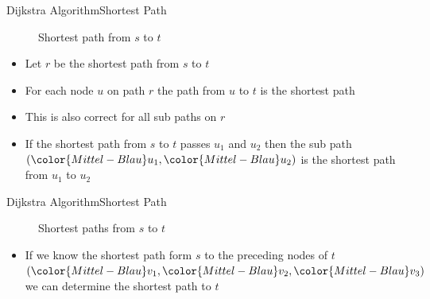 \begin{frame}{Dijkstra Algorithm}{Shortest Path}
  \vspace{-1.5em}
  \begin{figure}
    \begin{adjustbox}{width=0.75\linewidth}
      
    \end{adjustbox}
    \label{fig:dijkstra:shortest_path_introduction_re}
    \caption{Shortest path from {\color{Mittel-Blau}$s$} to
      {\color{Mittel-Blau}$t$}}
  \end{figure}
  \vspace{-1.5em}
  \begin{itemize}
    \item
      Let {\color{Mittel-Gruen}$r$} be the shortest path from
      {\color{Mittel-Blau}$s$} to {\color{Mittel-Blau}$t$}
    \item
      For each node {\color{Mittel-Blau}$u$} on path {\color{Mittel-Gruen}$r$}
      the path from {\color{Mittel-Blau}$u$} to {\color{Mittel-Blau}$t$} is
      the shortest path
    \item
      This is also correct for all sub paths on {\color{Mittel-Gruen}$r$}
    \item
      If the shortest path from {\color{Mittel-Blau}$s$} to
      {\color{Mittel-Blau}$t$} passes {\color{Mittel-Blau}$u_1$} and
      {\color{Mittel-Blau}$u_2$} then the sub path
      $({\color{Mittel-Blau}u_1}, {\color{Mittel-Blau}u_2})$
      is the shortest path from {\color{Mittel-Blau}$u_1$} to
      {\color{Mittel-Blau}$u_2$}
  \end{itemize}
\end{frame}


\begin{frame}{Dijkstra Algorithm}{Shortest Path}
  \begin{figure}%
    \begin{adjustbox}{width=0.75\linewidth}%
    \end{adjustbox}%
    \vspace{-1.0em}
    \label{fig:dijkstra:shortest_paths_introduction}%
    \caption{Shortest paths from {\color{Mittel-Blau}$s$} to
      {\color{Mittel-Blau}$t$}}
  \end{figure}
  \vspace{-1.0em}
  \begin{itemize}
    \item
      If we know the shortest path form {\color{Mittel-Blau}$s$}
      to the preceding nodes of {\color{Mittel-Blau}$t$}
      \begin{math}
        (
          {\color{Mittel-Blau}v_1},
          {\color{Mittel-Blau}v_2},
          {\color{Mittel-Blau}v_3}
        )
       \end{math}
       we can determine the shortest path to {\color{Mittel-Blau}$t$}
   \end{itemize}
\end{frame}

